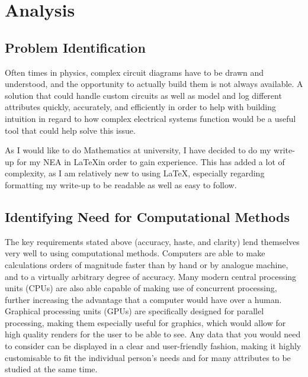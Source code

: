 \chapter{Analysis}
\graphicspath{{figures}}

\section{Problem Identification}

    Often times in physics, complex circuit diagrams have to be drawn and understood, and the opportunity to actually build them is not always available. A solution that could handle custom circuits as well as model and log different attributes quickly, accurately, and efficiently in order to help with building intuition in regard to how complex electrical systems function would be a useful tool that could help solve this issue.

    As I would like to do Mathematics at university, I have decided to do my write-up for my NEA in \LaTeX in order to gain experience. This has added a lot of complexity, as I am relatively new to using \LaTeX, especially regarding formatting my write-up to be readable as well as easy to follow.

\section{Identifying Need for Computational Methods}

    The key requirements stated above (accuracy, haste, and clarity) lend themselves very well to using computational methods. 
    Computers are able to make calculations orders of magnitude faster than by hand or by analogue machine, and to a virtually arbitrary degree of accuracy. 
    Many modern central processing units (CPUs) are also able capable of making use of concurrent processing, further increasing the advantage that a computer would have over a human.
    Graphical processing units (GPUs) are specifically designed for parallel processing, making them especially useful for graphics, which would allow for high quality renders for the user to be able to see. 
    Any data that you would need to consider can be displayed in a clear and user-friendly fashion, making it highly customisable to fit the individual person's needs and for many attributes to be studied at the same time.

    
